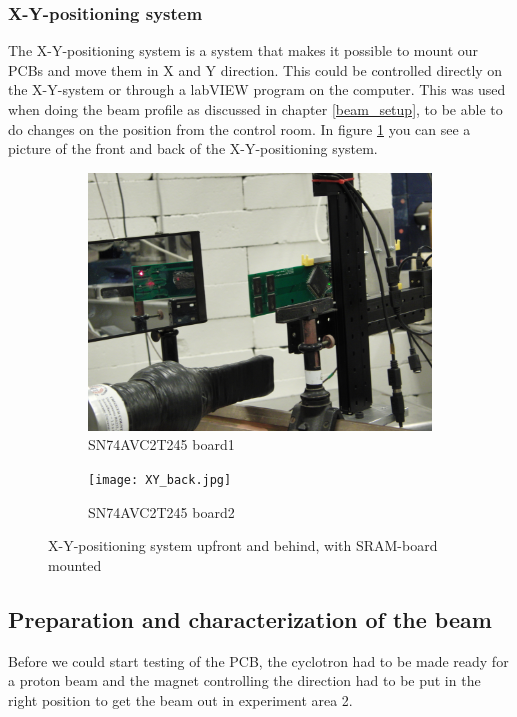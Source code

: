 \documentclass[12pt]{article}
\numberwithin{figure}{section}
\begin{document}
\newpage

\subsubsection{X-Y-positioning system}
The X-Y-positioning system is a system that makes it possible to mount our PCBs and move them in X and Y direction. This could be controlled directly on the X-Y-system or through a labVIEW program on the computer.
This was used when doing the beam profile as discussed in chapter \ref{beam_setup}, to be able to do changes on the position from the control room. In figure \ref{xy-table} you can see a picture of the front and back of the X-Y-positioning system.

\begin{figure}[!htbp]
\centering
  \begin{subfigure}{.49\textwidth}
  \centering
  \includegraphics[width=\linewidth]{XY_front.jpg}
  \caption{SN74AVC2T245 board1}
  \end{subfigure}
  \begin{subfigure}{.49\textwidth}
  \centering
  \texttt{[image: XY\_back.jpg]}
  \caption{SN74AVC2T245 board2}
  \end{subfigure}
 \caption{X-Y-positioning system upfront and behind, with SRAM-board mounted}
 \label{xy-table}
\end{figure}
\newpage

\subsection{Preparation and characterization of the beam}
Before we could start testing of the \ac{PCB}, the cyclotron had to be made ready for a proton beam and the magnet controlling the direction had to be put in the right position to get the beam out in experiment area 2.
\end{document}
